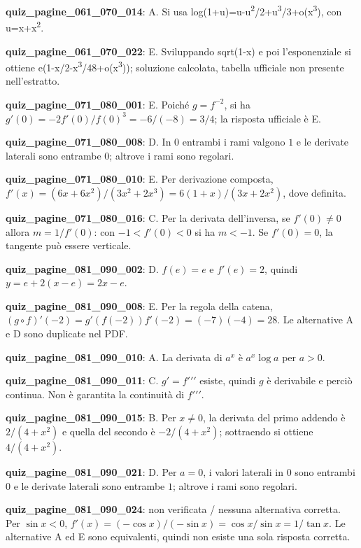 \documentclass[11pt,a4paper]{article}
\newcounter{quiz}
\begin{document}
\noindent\textbf{quiz\_pagine\_061\_070\_014}: A. Si usa log(1+u)=u-u\textsuperscript{2}/2+u\textsuperscript{3}/3+o(x\textsuperscript{3}), con u=x+x\textsuperscript{2}.\par\medskip
\noindent\textbf{quiz\_pagine\_061\_070\_022}: E. Sviluppando sqrt(1-x) e poi l'esponenziale si ottiene e(1-x/2-x\textsuperscript{3}/48+o(x\textsuperscript{3})); soluzione calcolata, tabella ufficiale non presente nell'estratto.\par\medskip
\noindent\textbf{quiz\_pagine\_071\_080\_001}: E. Poiché $g=f^{-2}$, si ha $g'(0)=-2f'(0)/f(0)^3=-6/(-8)=3/4$; la risposta ufficiale è E.\par\medskip
\noindent\textbf{quiz\_pagine\_071\_080\_008}: D. In $0$ entrambi i rami valgono $1$ e le derivate laterali sono entrambe $0$; altrove i rami sono regolari.\par\medskip
\noindent\textbf{quiz\_pagine\_071\_080\_010}: E. Per derivazione composta, $f'(x)=(6x+6x^2)/(3x^2+2x^3)=6(1+x)/(3x+2x^2)$, dove definita.\par\medskip
\noindent\textbf{quiz\_pagine\_071\_080\_016}: C. Per la derivata dell'inversa, se $f'(0)\ne0$ allora $m=1/f'(0)$: con $-1<f'(0)<0$ si ha $m<-1$. Se $f'(0)=0$, la tangente può essere verticale.\par\medskip
\noindent\textbf{quiz\_pagine\_081\_090\_002}: D. $f(e)=e$ e $f\prime(e)=2$, quindi $y=e+2(x-e)=2x-e$.\par\medskip
\noindent\textbf{quiz\_pagine\_081\_090\_008}: E. Per la regola della catena, $(g\circ f)\prime(-2)=g\prime(f(-2))f\prime(-2)=(-7)(-4)=28$. Le alternative A e D sono duplicate nel PDF.\par\medskip
\noindent\textbf{quiz\_pagine\_081\_090\_010}: A. La derivata di $a^x$ è $a^x\log a$ per $a>0$.\par\medskip
\noindent\textbf{quiz\_pagine\_081\_090\_011}: C. $g\prime=f\prime\prime\prime$ esiste, quindi $g$ è derivabile e perciò continua. Non è garantita la continuità di $f\prime\prime\prime$.\par\medskip
\noindent\textbf{quiz\_pagine\_081\_090\_015}: B. Per $x\neq0$, la derivata del primo addendo è $2/(4+x^2)$ e quella del secondo è $-2/(4+x^2)$; sottraendo si ottiene $4/(4+x^2)$.\par\medskip
\noindent\textbf{quiz\_pagine\_081\_090\_021}: D. Per $a=0$, i valori laterali in $0$ sono entrambi $0$ e le derivate laterali sono entrambe $1$; altrove i rami sono regolari.\par\medskip
\noindent\textbf{quiz\_pagine\_081\_090\_024}: non verificata / nessuna alternativa corretta. Per $\sin x<0$, $f\prime(x)=(-\cos x)/(-\sin x)=\cos x/\sin x=1/\tan x$. Le alternative A ed E sono equivalenti, quindi non esiste una sola risposta corretta.\par\medskip
\end{document}
